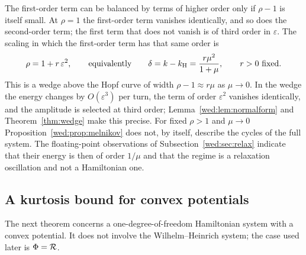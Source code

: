 The first-order term can be balanced by terms of higher order only if $\rho-1$ is itself small. At $\rho=1$ the first-order term vanishes identically, and so does the second-order term; the first term that does not vanish is of third order in $\varepsilon$. The scaling in which the first-order term has that same order is
\begin{equation}\label{wed:eq:wedge}
\rho=1+r\,\varepsilon^2,\qquad\text{equivalently}\qquad \delta=k-k_{\mathrm H}=\frac{r\mu^2}{1+\mu},\qquad r>0\ \text{fixed}.
\end{equation}
This is a wedge above the Hopf curve of width $\rho-1\approx r\mu$ as $\mu\to0$. In the wedge the energy changes by $O(\varepsilon^3)$ per turn, the term of order $\varepsilon^2$ vanishes identically, and the amplitude is selected at third order; Lemma~\ref{wed:lem:normalform} and Theorem~\ref{thm:wedge} make this precise. For fixed $\rho>1$ and $\mu\to0$ Proposition~\ref{wed:prop:melnikov} does not, by itself, describe the cycles of the full system. The floating-point observations of Subsection~\ref{wed:sec:relax} indicate that their energy is then of order $1/\mu$ and that the regime is a relaxation oscillation and not a Hamiltonian one.

\subsection{A kurtosis bound for convex potentials}\label{wed:sec:kurtosis}
The next theorem concerns a one-degree-of-freedom Hamiltonian system with a convex potential. It does not involve the Wilhelm--Heinrich system; the case used later is $\Phi=\mathcal R$.

